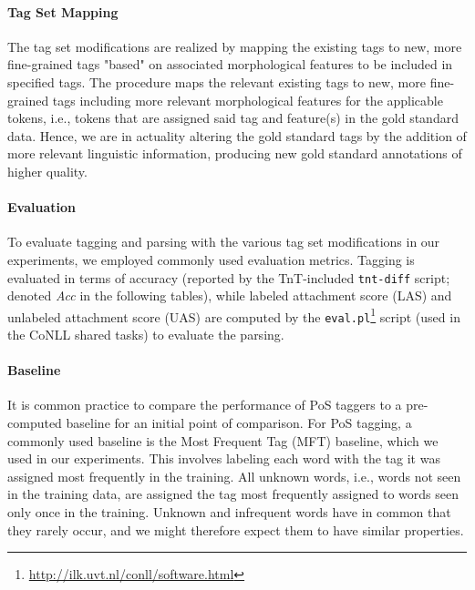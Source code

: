 \documentclass[11pt,a4paper]{article}
\begin{document}
\paragraph{Tag Set Mapping}
The tag set modifications are realized by mapping the existing tags to new,
more fine-grained tags "based" on associated morphological features to be
included in specified tags. The procedure maps the relevant existing tags to
new, more fine-grained tags including more relevant morphological features for
the applicable tokens, i.e., tokens that are assigned said tag and feature(s)
in the gold standard data. Hence, we are in actuality altering the gold
standard tags by the addition of more relevant linguistic information,
producing new gold standard annotations of higher quality.



\paragraph{Evaluation}
To evaluate tagging and parsing with the various tag set modifications in our
experiments, we employed commonly used evaluation metrics. Tagging is evaluated
in terms of accuracy (reported by the TnT-included \texttt{tnt-diff} script;
denoted \emph{Acc} in the following tables), while labeled attachment score
(LAS) and unlabeled attachment score (UAS) are computed by the
\texttt{eval.pl}\footnote{\url{http://ilk.uvt.nl/conll/software.html}} script
(used in the CoNLL shared tasks) to evaluate the parsing.

\paragraph{Baseline}
It is common practice to compare the performance of PoS taggers to a
pre-computed baseline for an initial point of comparison.  For PoS tagging, a
commonly used baseline is the Most Frequent Tag (MFT) baseline, which we used
in our experiments. This involves labeling each word with the tag it was
assigned most frequently in the training. All unknown words, i.e., words not
seen in the training data, are assigned the tag most frequently assigned to
words seen only once in the training. Unknown and infrequent words have in
common that they rarely occur, and we might therefore expect them to have
similar properties.
\end{document}
